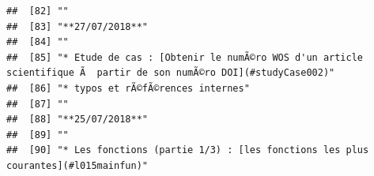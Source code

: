 \documentclass[]{book}
\begin{document}
\begin{verbatim}
##  [82] ""                                                                                                                                                                                                                                                                                                           
##  [83] "**27/07/2018**"                                                                                                                                                                                                                                                                                             
##  [84] ""                                                                                                                                                                                                                                                                                                           
##  [85] "* Etude de cas : [Obtenir le numÃ©ro WOS d'un article scientifique Ã  partir de son numÃ©ro DOI](#studyCase002)"                                                                                                                                                                                            
##  [86] "* typos et rÃ©fÃ©rences internes"                                                                                                                                                                                                                                                                           
##  [87] ""                                                                                                                                                                                                                                                                                                           
##  [88] "**25/07/2018**"                                                                                                                                                                                                                                                                                             
##  [89] ""                                                                                                                                                                                                                                                                                                           
##  [90] "* Les fonctions (partie 1/3) : [les fonctions les plus courantes](#l015mainfun)"                                                                                                                                                                                                                            

\end{verbatim}
\end{document}
